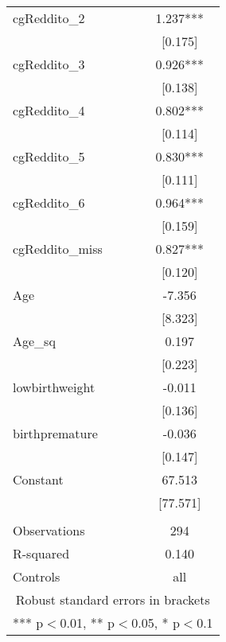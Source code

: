 \documentclass[]{article}
\begin{document}
\begin{tabular}{lc}
cgReddito\_2 & 1.237*** \\
 & [0.175] \\
cgReddito\_3 & 0.926*** \\
 & [0.138] \\
cgReddito\_4 & 0.802*** \\
 & [0.114] \\
cgReddito\_5 & 0.830*** \\
 & [0.111] \\
cgReddito\_6 & 0.964*** \\
 & [0.159] \\
cgReddito\_miss & 0.827*** \\
 & [0.120] \\
Age & -7.356 \\
 & [8.323] \\
Age\_sq & 0.197 \\
 & [0.223] \\
lowbirthweight & -0.011 \\
 & [0.136] \\
birthpremature & -0.036 \\
 & [0.147] \\
Constant & 67.513 \\
 & [77.571] \\
 &  \\
Observations & 294 \\
R-squared & 0.140 \\
 Controls & all \\ \hline
\multicolumn{2}{c}{ Robust standard errors in brackets} \\
\multicolumn{2}{c}{ *** p$<$0.01, ** p$<$0.05, * p$<$0.1} \\
\end{tabular}
\end{document}
